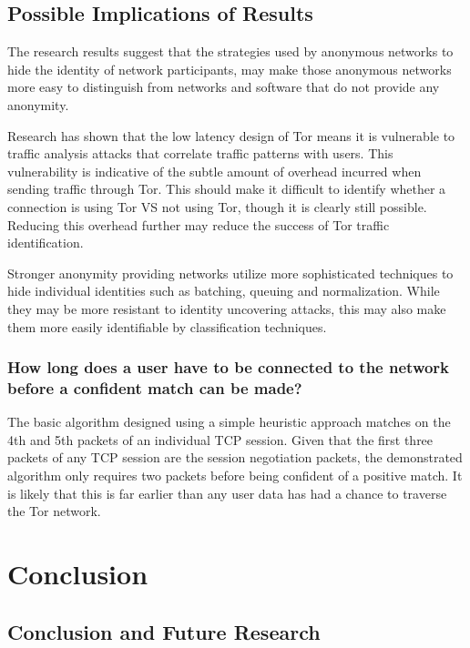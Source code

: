 

\section{Possible Implications of Results}

The research results suggest that the strategies used by anonymous networks to
hide the identity of network participants, may make those anonymous networks
more easy to distinguish from networks and software that do not provide any
anonymity.

Research has shown that the low latency design of Tor means it is vulnerable to
traffic analysis attacks that correlate traffic patterns with users. This
vulnerability is indicative of the subtle amount of overhead incurred when
sending traffic through Tor. This should make it difficult to identify whether a
connection is using Tor VS not using Tor, though it is clearly still possible.
Reducing this overhead further may reduce the success of Tor traffic
identification.

Stronger anonymity providing networks utilize more sophisticated techniques to
hide individual identities such as batching, queuing and normalization. While
they may be more resistant to identity uncovering attacks, this may also make
them more easily identifiable by classification techniques.

\subsection{How long does a user have to be connected to the network before a
confident match can be made?}

The basic algorithm designed using a simple heuristic approach matches on the
4th and 5th packets of an individual TCP session. Given that the first three
packets of any TCP session are the session negotiation packets, the
demonstrated algorithm only requires two packets before being confident of a
positive match. It is likely that this is far earlier than any user data has
had a chance to traverse the Tor network.

\chapter{Conclusion}

\section{Conclusion and Future Research}


